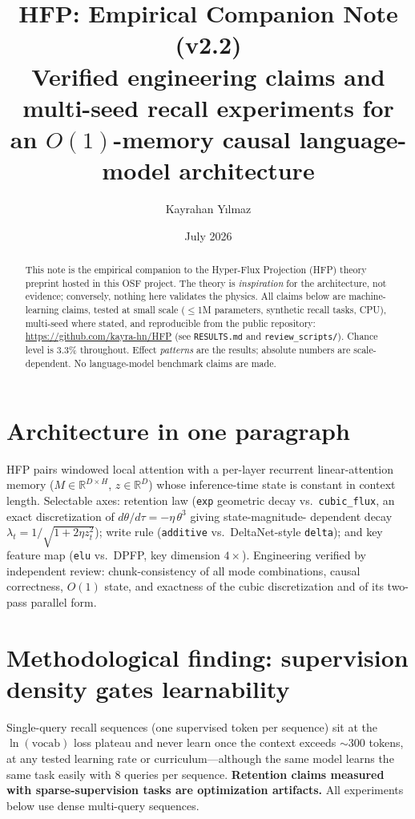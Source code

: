 \documentclass[11pt,a4paper]{article}
\title{HFP: Empirical Companion Note (v2.2)\\
\large Verified engineering claims and multi-seed recall experiments for an
$O(1)$-memory causal language-model architecture}
\author{Kayrahan Y{\i}lmaz}
\date{July 2026}
\newcommand{\code}[1]{\texttt{#1}}
\begin{document}
\maketitle

\begin{abstract}
\noindent
This note is the empirical companion to the Hyper-Flux Projection (HFP) theory
preprint hosted in this OSF project. The theory is \emph{inspiration} for the
architecture, not evidence; conversely, nothing here validates the physics.
All claims below are machine-learning claims, tested at small scale
($\le$1M parameters, synthetic recall tasks, CPU), multi-seed where stated, and
reproducible from the public repository:
\url{https://github.com/kayra-hn/HFP} (see \code{RESULTS.md} and
\code{review\_scripts/}). Chance level is 3.3\% throughout. Effect
\emph{patterns} are the results; absolute numbers are scale-dependent.
No language-model benchmark claims are made.
\end{abstract}

\section{Architecture in one paragraph}
HFP pairs windowed local attention with a per-layer recurrent linear-attention
memory ($M \in \mathbb{R}^{D\times H}$, $z \in \mathbb{R}^{D}$) whose
inference-time state is constant in context length. Selectable axes:
retention law (\code{exp} geometric decay vs.\ \code{cubic\_flux}, an exact
discretization of $d\theta/d\tau = -\eta\,\theta^{3}$ giving state-magnitude-%
dependent decay $\lambda_t = 1/\sqrt{1+2\eta z_t^{2}}$); write rule
(\code{additive} vs.\ DeltaNet-style \code{delta}); and key feature map
(\code{elu} vs.\ DPFP, key dimension $4\times$). Engineering verified by
independent review: chunk-consistency of all mode combinations, causal
correctness, $O(1)$ state, and exactness of the cubic discretization and of its
two-pass parallel form.

\section{Methodological finding: supervision density gates learnability}
Single-query recall sequences (one supervised token per sequence) sit at the
$\ln(\mathrm{vocab})$ loss plateau and never learn once the context exceeds
$\sim$300 tokens, at any tested learning rate or curriculum---although the same
model learns the same task easily with 8 queries per sequence.
\textbf{Retention claims measured with sparse-supervision tasks are
optimization artifacts.} All experiments below use dense multi-query sequences.
\end{document}
